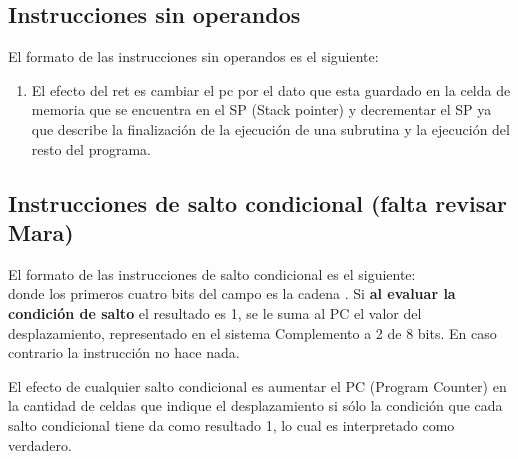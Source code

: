 \subsection{Instrucciones sin operandos}

El formato de las instrucciones sin operandos es el siguiente:\\



\begin{enumerate}
\item  {}
El efecto del ret es cambiar el pc por el dato que esta guardado en la celda de memoria que se encuentra en el SP (Stack pointer) y decrementar el SP ya que describe la finalización de la ejecución de una subrutina y la ejecución del resto del programa.
\end{enumerate}


\subsection{Instrucciones de salto condicional  (falta revisar Mara)}

El formato de las instrucciones de salto condicional es el siguiente:\\

 donde los primeros cuatro bits del campo  es la cadena . Si \textbf{al evaluar la condición de salto} el resultado es 1, se le suma al PC el valor del desplazamiento, representado en el sistema Complemento a 2 de 8 bits. En caso contrario la instrucción no hace nada.


El efecto de cualquier salto condicional es aumentar el PC (Program Counter) en la cantidad de celdas que indique el desplazamiento si sólo la condición que cada salto condicional tiene da como resultado 1, lo cual es interpretado como verdadero.

